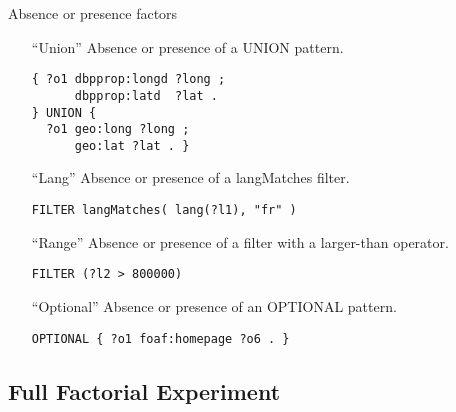 \documentclass[english,handout,aspectratio=169]{ifislide}
\begin{document}
\begin{frame}[fragile]{Absence or presence factors}
  \begin{itemize}
  \item [``Union''] Absence or presence of a \textsf{UNION} pattern.

    \begin{verbatim}
{ ?o1 dbpprop:longd ?long ;
      dbpprop:latd  ?lat .
} UNION {
  ?o1 geo:long ?long ;
      geo:lat ?lat . }
\end{verbatim} 

  \item [``Lang''] Absence or presence of a \textsf{langMatches}
    filter.

\begin{verbatim}
FILTER langMatches( lang(?l1), "fr" ) 
\end{verbatim} 


  \item [``Range''] Absence or presence of a filter with a larger-than
    operator.

    \begin{verbatim}
FILTER (?l2 > 800000)
\end{verbatim} 

  \item [``Optional''] Absence or presence of an \textsf{OPTIONAL}
    pattern.
    \begin{verbatim}
OPTIONAL { ?o1 foaf:homepage ?o6 . }
\end{verbatim} 

  \end{itemize}
\end{frame}

\subsection{Full Factorial Experiment}
\end{document}
